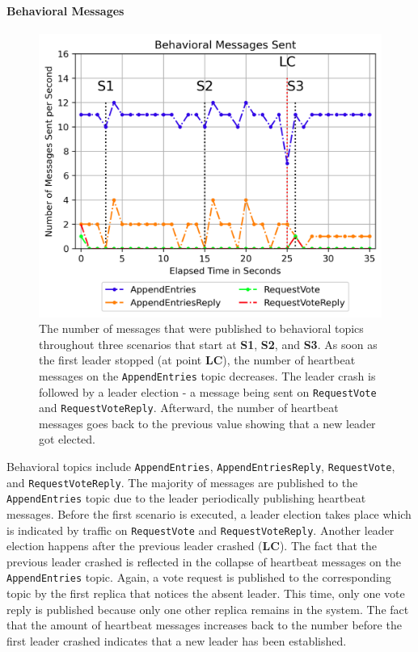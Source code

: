 \paragraph{Behavioral Messages}

\begin{figure}[h!]
	\centering
	\includegraphics[width=0.8\linewidth]{images/plots/ConsensusMessagesSent}
	\caption{The number of messages that were published to behavioral topics throughout three scenarios that start at \textbf{S1}, \textbf{S2}, and \textbf{S3}. As soon as the first leader stopped (at point \textbf{LC}), the number of heartbeat messages on the \texttt{AppendEntries} topic decreases. The leader crash is followed by a leader election - a message being sent on \texttt{RequestVote} and \texttt{RequestVoteReply}. Afterward, the number of heartbeat messages goes back to the previous value showing that a new leader got elected.}
	\label{fig:PlotConsensusMessagesSent}
\end{figure}

Behavioral topics include \texttt{AppendEntries}, \texttt{AppendEntriesReply}, \texttt{RequestVote}, and \texttt{RequestVoteReply}.
The majority of messages are published to the \texttt{AppendEntries} topic due to the leader periodically publishing heartbeat messages.
Before the first scenario is executed, a leader election takes place which is indicated by traffic on \texttt{RequestVote} and \texttt{RequestVoteReply}.
Another leader election happens after the previous leader crashed (\textbf{LC}).
The fact that the previous leader crashed is reflected in the collapse of heartbeat messages on the \texttt{AppendEntries} topic.
Again, a vote request is published to the corresponding topic by the first replica that notices the absent leader.
This time, only one vote reply is published because only one other replica remains in the system.
The fact that the amount of heartbeat messages increases back to the number before the first leader crashed indicates that a new leader has been established.



